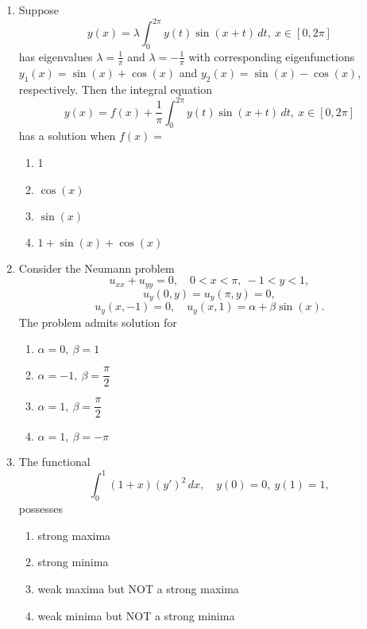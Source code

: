 \documentclass[journal]{IEEEtran}
\numberwithin{equation}{enumi}
\numberwithin{figure}{enumi}
\begin{document}
\begin{enumerate}
\item Suppose
\[
y(x) = \lambda \int_0^{2\pi} y(t) \sin(x + t)\, dt,\ x \in [0,2\pi]
\]
has eigenvalues $\lambda = \frac{1}{\pi}$ and $\lambda = -\frac{1}{\pi}$ with corresponding eigenfunctions \\
$y_1(x) = \sin(x) + \cos(x)$ and $y_2(x) = \sin(x) - \cos(x)$, respectively. Then the integral equation
\[
y(x) = f(x) + \frac{1}{\pi} \int_0^{2\pi} y(t) \sin(x + t)\, dt,\ x \in [0,2\pi]
\]
has a solution when $f(x) =$
\hfill{}
\begin{multicols}{4}
\begin{enumerate}
    \item 1
    \item $\cos(x)$
    \item $\sin(x)$
    \item $1 + \sin(x) + \cos(x)$
\end{enumerate}
\end{multicols}



\item Consider the Neumann problem
\[
u_{xx} + u_{yy} = 0,\quad 0 < x < \pi,\ -1 < y < 1,
\]
\[
u_y(0, y) = u_y(\pi, y) = 0,
\]
\[
u_y(x, -1) = 0,\quad u_y(x, 1) = \alpha + \beta \sin(x).
\]
The problem admits solution for
\hfill{}
\begin{multicols}{2}
    \begin{enumerate}
        \item $\alpha = 0,\ \beta = 1$
        \item $\alpha = -1,\ \beta = \dfrac{\pi}{2}$ 
        \item $\alpha = 1,\ \beta = \dfrac{\pi}{2}$
        \item $\alpha = 1,\ \beta = -\pi$
    \end{enumerate}
    \end{multicols}


\item The functional
\[
\int_0^1 (1+x)(y')^2 \, dx,\quad y(0) = 0,\ y(1) = 1,
\]
possesses
\hfill{}

    \begin{enumerate}
        \item strong maxima
        \item strong minima
        \item weak maxima but NOT a strong maxima
        \item weak minima but NOT a strong minima   
    \end{enumerate}
  


\end{enumerate}
\end{document}
